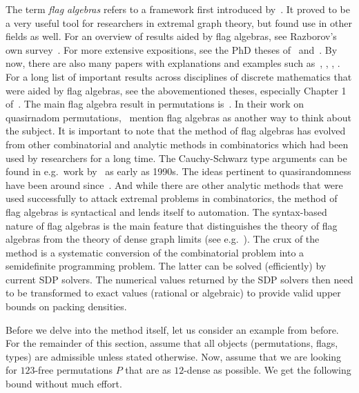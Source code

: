 The term \emph{flag algebras} refers to a framework first introduced by~\cite{razborov2007original}. It proved to be a very useful tool for researchers in extremal graph theory, but found use in other fields as well. For an overview of results aided by flag algebras, see Razborov's own survey~\cite{razborov2013interim}. For more extensive expositions, see the PhD theses of~\cite{sperfeld2012thesis} and~\cite{volec2014thesis}. By now, there are also many papers with explanations and examples such as~\cite{babertalbot2011jump}, \cite{pikhurko2015neighbourhoods}, \cite{falgasvaughan2012densities}, \cite{falgas2013applications}. For a long list of important results across disciplines of discrete mathematics that were aided by flag algebras, see the abovementioned theses, especially Chapter 1 of~\cite{volec2014thesis}. The main flag algebra result in permutations is~\cite{balogh2015minimum}. In their work on quasirnadom permutations,~\cite{kral2013quasirandom} mention flag algebras as another way to think about the subject. It is important to note that the method of flag algebras has evolved from other combinatorial and analytic methods in combinatorics which had been used by researchers for a long time. The Cauchy-Schwarz type arguments can be found in e.g.~work by~\cite{bondy1997cs} as early as 1990s. The ideas pertinent to quasirandomness have been around since~\cite{chung1988quasirandom}. And while there are other analytic methods that were used successfully to attack extremal problems in combinatorics, the method of flag algebras is syntactical and lends itself to automation. The syntax-based nature of flag algebras is the main feature that distinguishes the theory of flag algebras from the theory of dense graph limits (see e.g.~\cite{lovasz2012networks}). The crux of the method is a systematic conversion of the combinatorial problem into a semidefinite programming problem. The latter can be solved (efficiently) by current SDP solvers. The numerical values returned by the SDP solvers then need to be transformed to exact values (rational or algebraic) to provide valid upper bounds on packing densities.

Before we delve into the method itself, let us consider an example from before. For the remainder of this section, assume that all objects (permutations, flags, types) are admissible unless stated otherwise. Now, assume that we are looking for $123$-free permutations $P$ that are as $12$-dense as possible. We get the following bound without much effort.

